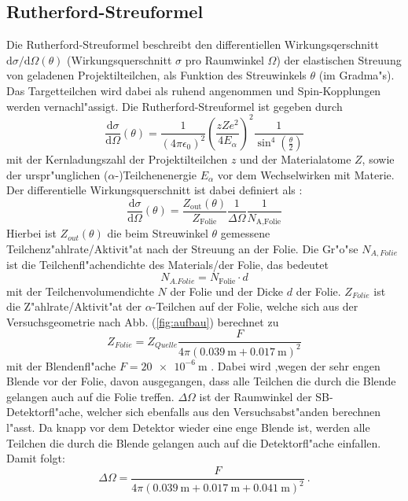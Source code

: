   \subsection{Rutherford-Streuformel}
    Die Rutherford-Streuformel beschreibt den differentiellen Wirkungsqerschnitt $\text{d}\sigma/\text{d}\Omega(\theta)$ (Wirkungsquerschnitt $\sigma$ pro Raumwinkel $\Omega$) der elastischen Streuung von geladenen Projektilteilchen, als Funktion des Streuwinkels $\theta$ (im Gradma"s).
    Das Targetteilchen wird dabei als ruhend angenommen und Spin-Kopplungen werden vernachl"assigt.
    Die Rutherford-Streuformel ist gegeben durch
    \begin{equation}
      \frac{\text{d}\sigma}{\text{d}\Omega}(\theta) = \frac{1}{(4\pi \epsilon_0)^2} \left( \frac{zZe^2}{4E_{\alpha}} \right)^2 \frac{1}{\sin^4(\frac{\theta}{2})}
      \label{ruther}
    \end{equation}
    mit der Kernladungszahl der Projektilteilchen $z$ und der Materialatome $Z$, sowie der urspr"unglichen ($\alpha$-)Teilchenenergie $E_{\alpha}$ vor dem Wechselwirken mit Materie.
    Der differentielle Wirkungsquerschnitt ist dabei definiert als \cite{omega}:
    \begin{equation}
      \frac{\text{d}\sigma}{\text{d}\Omega}(\theta) = \frac{Z_{\text{out}}(\theta)}{Z_{\text{Folie}}} \frac{1}{\Delta \Omega} \frac{1}{N_{\text{A,Folie}}}
    \end{equation}
    Hierbei ist $Z_{out}(\theta)$ die beim Streuwinkel $\theta$ gemessene Teilchenz"ahlrate/Aktivit"at nach der Streuung an der Folie.
    Die Gr"o"se $N_{A,Folie}$ ist die Teilchenfl"achendichte des Materials/der Folie, das bedeutet
    \begin{equation}
      N_{{A.Folie}} = N_{\text{Folie}} \cdot d
    \end{equation}
    mit der Teilchenvolumendichte $N$ der Folie und der Dicke $d$ der Folie.
    $Z_{Folie}$ ist die Z"ahlrate/Aktivit"at der $\alpha$-Teilchen auf der Folie, welche sich aus der Versuchsgeometrie nach Abb. (\ref{fig:aufbau}) berechnet zu
    \begin{equation}
      Z_{Folie}=Z_{Quelle}\frac{F}{4\pi(\SI{0.039}{\meter}+\SI{0,017}{\meter})^2}
    \end{equation}
    mit der Blendenfl"ache $F=\SI{20e-6}{\meter}$ \cite{Anleitung}.
    Dabei wird ,wegen der sehr engen Blende vor der Folie, davon ausgegangen, dass alle Teilchen die durch die Blende gelangen auch auf die Folie treffen.
    $\Delta \Omega$ ist der Raumwinkel der SB-Detektorfl"ache, welcher sich ebenfalls aus den Versuchsabst"anden berechnen l"asst. Da knapp vor dem Detektor wieder eine enge Blende ist, werden alle Teilchen die durch die Blende gelangen auch auf die Detektorfl"ache einfallen. Damit folgt:
    \begin{equation}
      \Delta \Omega = \frac{F}{4\pi(\SI{0.039}{\meter}+\SI{0.017}{\meter}+\SI{0.041}{\meter})^2} \: .
    \end{equation}

